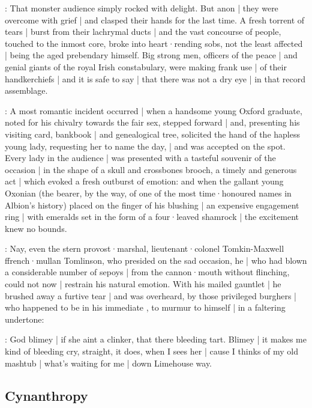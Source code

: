 :
That monster audience simply rocked with delight.
But anon |
they were overcome with grief |
and clasped their hands for the last time.
A fresh torrent of tears |
burst from their lachrymal ducts |
and the vast concourse of people,
touched to the inmost core,
broke into heart·rending sobs,
not the least affected |
being the aged prebendary himself.
Big strong men,
officers of the peace |
and genial giants of the royal Irish constabulary,
were making frank use |
of their handkerchiefs |
and it is safe to say |
that there was not a dry eye |
in that record assemblage.

:
A most romantic incident occurred |
when a handsome young Oxford graduate,
noted for his chivalry towards the fair sex,
stepped forward |
and,
presenting his visiting card,
bankbook |
and genealogical tree,
solicited the hand of the hapless young lady,
requesting her to name the day, |
and was accepted on the spot.
Every lady in the audience |
was presented with a tasteful souvenir of the occasion |
in the shape of a skull and crossbones brooch,
a timely and generous act |
which evoked a fresh outburst of emotion:
and when the gallant young Oxonian
(the bearer,
by the way,
of one of the most time·honoured names in Albion's history)
placed on the finger of his blushing  |
an expensive engagement ring |
with emeralds set in the form of a four·leaved shamrock |
the excitement knew no bounds.

:
Nay,
even the stern provost·marshal,
lieutenant·colonel Tomkin-Maxwell ffrench·mullan Tomlinson,
who presided on the sad occasion,
he |
who had blown a considerable number of sepoys |
from the cannon·mouth without flinching,
could not now |
restrain his natural emotion.
With his mailed gauntlet |
he brushed away a furtive tear |
and was overheard,
by those privileged burghers |
who happened to be in his immediate ,
to murmur to himself |
in a faltering undertone:

\tomlinson:
God blimey |
if she aint a clinker,
that there bleeding tart.
Blimey |
it makes me kind of bleeding cry,
straight,
it does,
when I sees her |
cause I thinks of my old mashtub |
what's waiting for me |
down Limehouse way.


\subsection*{Cynanthropy}

